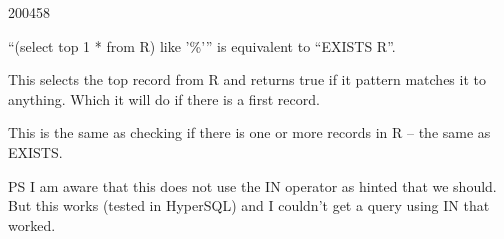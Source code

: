 \documentclass[10pt,\jkfside,a4paper]{article}
\begin{document}
\begin{examquestion}{2004}{5}{8}
\begin{enumerate}
``{\ttfamily (select top 1 * from R) like '\%'}'' is equivalent to ``{\ttfamily EXISTS R}''.

This selects the top record from R and returns true if it pattern matches it to anything. Which it will do if there is a first record.

This is the same as checking if there is one or more records in R -- the same as {\ttfamily EXISTS}.

PS I am aware that this does not use the {\ttfamily IN} operator as hinted that we should. But this works (tested in HyperSQL) and I couldn't get a query using {\ttfamily IN} that worked.

\end{enumerate}
\end{examquestion}
\end{document}
